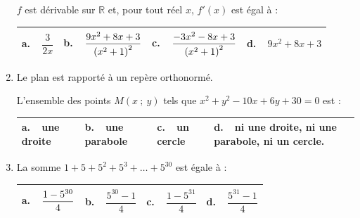 \documentclass[10pt]{article}
\providecommand{\R}{\mathbb{R}}
\begin{document}
\begin{enumerate}
$f$ est dérivable sur $\R$ et, pour tout réel $x$,\; $f'(x)$ est égal à :

\begin{center}
\begin{tabularx}{\linewidth}{|*{4}{X|}}\hline
\textbf{a.~~}$\dfrac{3}{2x}$&\textbf{b.~~}$\dfrac{9x^2+8x+3\rule{0pt}{10pt}}{\left(x^2+1\right)^2}$&\textbf{c.~~}$\dfrac{-3x^2- 8x+3\rule{0pt}{10pt}}{\left(x^2+1\right)^2}$&\textbf{d.~~}$9x^2 + 8x+ 3$\\ \hline
\end{tabularx}
\end{center}

\item  Le plan est rapporté à un repère orthonormé.

L'ensemble des points $M(x~;~y)$ tels que $x^2 + y^2 - 10x +6y +30 = 0$ est :

\begin{center}
\begin{tabularx}{\linewidth}{|*{4}{X|}}\hline
\textbf{a.~~}une droite&\textbf{b.~~}une parabole&\textbf{c.~~}un cercle&\textbf{d.~~}ni une droite, ni une parabole, ni un cercle.\\ \hline
\end{tabularx}
\end{center}

\item La somme $1 + 5 + 5^2 + 5^3 + \ldots + 5^{30}$ est égale à :

\begin{center}
\begin{tabularx}{\linewidth}{|*{4}{X|}}\hline
\textbf{a.~~}$\dfrac{1 - 5^{30}\rule{0pt}{10pt}}{4\rule[-3pt]{0pt}{0pt}}$
&\textbf{b.~~}$\dfrac{5^{30} - 1}{4}$
&\textbf{c.~~}$\dfrac{1 - 5^{31}}{4}$
&\textbf{d.~~}$\dfrac{5^{31} - 1}{4}$\\ \hline
\end{tabularx}
\end{center}
\end{enumerate}

\bigskip
\end{document}
